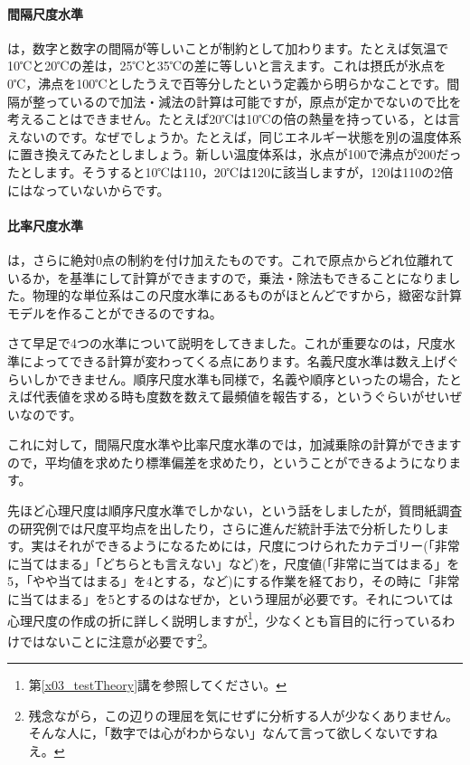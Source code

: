 \documentclass{ltjsbook}
\begin{document}
\paragraph{間隔尺度水準} は，数字と数字の間隔が等しいことが制約として加わります。たとえば気温で10℃と20℃の差は，25℃と35℃の差に等しいと言えます。これは摂氏が氷点を0℃，沸点を100℃としたうえで百等分したという定義から明らかなことです。間隔が整っているので加法・減法の計算は可能ですが，原点が定かでないので比を考えることはできません。たとえば20℃は10℃の倍の熱量を持っている，とは言えないのです。なぜでしょうか。たとえば，同じエネルギー状態を別の温度体系に置き換えてみたとしましょう。新しい温度体系は，氷点が100で沸点が200だったとします。そうすると10℃は110，20℃は120に該当しますが，120は110の2倍にはなっていないからです。

\paragraph{比率尺度水準}  は，さらに絶対0点の制約を付け加えたものです。これで原点からどれ位離れているか，を基準にして計算ができますので，乗法・除法もできることになりました。物理的な単位系はこの尺度水準にあるものがほとんどですから，緻密な計算モデルを作ることができるのですね。

さて早足で4つの水準について説明をしてきました。これが重要なのは，尺度水準によってできる計算が変わってくる点にあります。名義尺度水準は数え上げぐらいしかできません。順序尺度水準も同様で，名義や順序といったの場合，たとえば代表値を求める時も度数を数えて最頻値を報告する，というぐらいがせいぜいなのです。

これに対して，間隔尺度水準や比率尺度水準のでは，加減乗除の計算ができますので，平均値を求めたり標準偏差を求めたり，ということができるようになります。

先ほど心理尺度は順序尺度水準でしかない，という話をしましたが，質問紙調査の研究例では尺度平均点を出したり，さらに進んだ統計手法で分析したりします。実はそれができるようになるためには，尺度につけられたカテゴリー(「非常に当てはまる」「どちらとも言えない」など)を，尺度値(「非常に当てはまる」を5，「やや当てはまる」を4とする，など)にする作業を経ており，その時に「非常に当てはまる」を5とするのはなぜか，という理屈が必要です。それについては心理尺度の作成の折に詳しく説明しますが\footnote{第\ref{x03_testTheory}講を参照してください。}，少なくとも盲目的に行っているわけではないことに注意が必要です\footnote{残念ながら，この辺りの理屈を気にせずに分析する人が少なくありません。そんな人に，「数字では心がわからない」なんて言って欲しくないですねえ。}。
\end{document}

